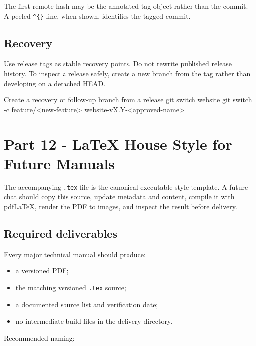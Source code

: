 \documentclass[11pt,letterpaper]{article}
\begin{document}
The first remote hash may be the annotated tag object rather than the commit.
A peeled \texttt{\^{}\{\}} line, when shown, identifies the tagged commit.

\subsection{Recovery}

Use release tags as stable recovery points. Do not rewrite published release
history. To inspect a release safely, create a new branch from the tag rather
than developing on a detached HEAD.

\begin{commandbox}{Create a recovery or follow-up branch from a release}
git switch website
git switch -c feature/<new-feature> website-vX.Y-<approved-name>
\end{commandbox}

\section{Part 12 - LaTeX House Style for Future Manuals}

\begin{authoringbox}
The accompanying \texttt{.tex} file is the canonical executable style
template. A future chat should copy this source, update metadata and content,
compile it with pdfLaTeX, render the PDF to images, and inspect the result
before delivery.
\end{authoringbox}

\subsection{Required deliverables}

Every major technical manual should produce:

\begin{itemize}
    \item a versioned PDF;
    \item the matching versioned \texttt{.tex} source;
    \item a documented source list and verification date;
    \item no intermediate build files in the delivery directory.
\end{itemize}

Recommended naming:
\end{document}
